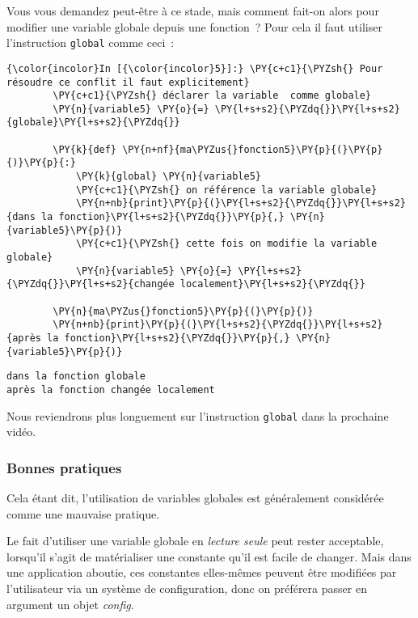     Vous vous demandez peut-être à ce stade, mais comment fait-on alors pour
modifier une variable globale depuis une fonction~? Pour cela il faut
utiliser l'instruction \texttt{global} comme ceci~:

    \begin{Verbatim}[commandchars=\\\{\}]
{\color{incolor}In [{\color{incolor}5}]:} \PY{c+c1}{\PYZsh{} Pour résoudre ce conflit il faut explicitement}
        \PY{c+c1}{\PYZsh{} déclarer la variable  comme globale}
        \PY{n}{variable5} \PY{o}{=} \PY{l+s+s2}{\PYZdq{}}\PY{l+s+s2}{globale}\PY{l+s+s2}{\PYZdq{}}
        
        \PY{k}{def} \PY{n+nf}{ma\PYZus{}fonction5}\PY{p}{(}\PY{p}{)}\PY{p}{:}
            \PY{k}{global} \PY{n}{variable5}
            \PY{c+c1}{\PYZsh{} on référence la variable globale}
            \PY{n+nb}{print}\PY{p}{(}\PY{l+s+s2}{\PYZdq{}}\PY{l+s+s2}{dans la fonction}\PY{l+s+s2}{\PYZdq{}}\PY{p}{,} \PY{n}{variable5}\PY{p}{)}
            \PY{c+c1}{\PYZsh{} cette fois on modifie la variable globale}
            \PY{n}{variable5} \PY{o}{=} \PY{l+s+s2}{\PYZdq{}}\PY{l+s+s2}{changée localement}\PY{l+s+s2}{\PYZdq{}}
        
        \PY{n}{ma\PYZus{}fonction5}\PY{p}{(}\PY{p}{)}
        \PY{n+nb}{print}\PY{p}{(}\PY{l+s+s2}{\PYZdq{}}\PY{l+s+s2}{après la fonction}\PY{l+s+s2}{\PYZdq{}}\PY{p}{,} \PY{n}{variable5}\PY{p}{)}
\end{Verbatim}


    \begin{Verbatim}[commandchars=\\\{\}]
dans la fonction globale
après la fonction changée localement

    \end{Verbatim}

    Nous reviendrons plus longuement sur l'instruction \texttt{global} dans
la prochaine vidéo.

    \hypertarget{bonnes-pratiques}{%
\subsubsection{Bonnes pratiques}\label{bonnes-pratiques}}

    Cela étant dit, l'utilisation de variables globales est généralement
considérée comme une mauvaise pratique.

Le fait d'utiliser une variable globale en \emph{lecture seule} peut
rester acceptable, lorsqu'il s'agit de matérialiser une constante qu'il
est facile de changer. Mais dans une application aboutie, ces constantes
elles-mêmes peuvent être modifiées par l'utilisateur via un système de
configuration, donc on préférera passer en argument un objet
\emph{config}.

